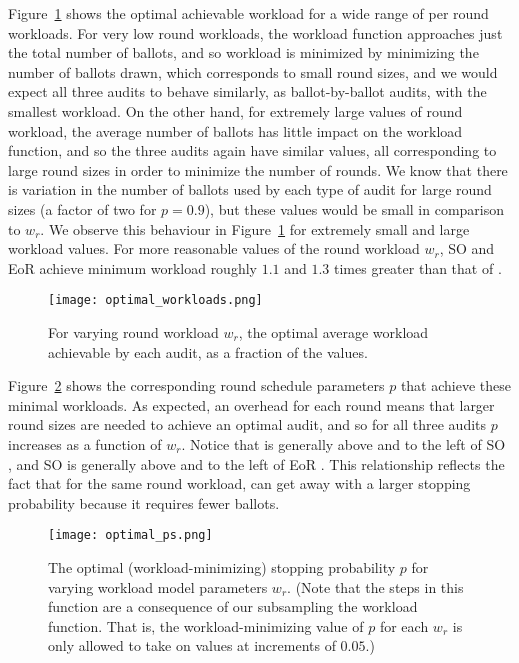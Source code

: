 Figure~\ref{fig:optimal_workloads} shows the optimal achievable workload for a wide range of per round workloads. For very low round workloads, the workload function approaches just the total number of ballots, and so workload is minimized by minimizing the number of ballots drawn, which corresponds to small round sizes, and we would expect all three audits to behave similarly, as ballot-by-ballot audits, with the smallest workload. On the other hand, for extremely large values of round workload, the average number of ballots has little impact on the workload function, and so the three audits again have similar values, all corresponding to large round sizes in order to minimize the number of rounds.  We know that there is variation in the number of ballots used by each type of audit for large round sizes (a factor of two for $p=0.9$), but these values would be small in comparison to $w_r$. We observe this behaviour in Figure~\ref{fig:optimal_workloads} for extremely small and large workload values. For more reasonable values of the round workload $w_r$, SO \BRAVO and EoR \BRAVO achieve minimum workload roughly $1.1$ and $1.3$ times greater than that of \Providence.
\begin{figure}[h!]
\texttt{[image: optimal\_workloads.png]}
\caption{For varying round workload $w_r$, the optimal average workload achievable by each audit, as a fraction of the \Providence values.}
\label{fig:optimal_workloads}
\end{figure}

Figure~\ref{fig:optimal_ps} shows the corresponding round schedule parameters $p$ that achieve these minimal workloads. As expected, an overhead for each round means that larger round sizes are needed to achieve an optimal audit, and so for all three audits $p$ increases as a function of $w_r$. Notice that \Providence is generally above and to the left of SO \BRAVO, and SO \BRAVO is generally above and to the left of EoR \BRAVO. This relationship reflects the fact that for the same round workload, \Providence can get away with a larger stopping probability because it requires fewer ballots.
\begin{figure}[h!]
\texttt{[image: optimal\_ps.png]}
\caption{The optimal (workload-minimizing) stopping probability $p$ for varying workload model parameters $w_r$. (Note that the steps in this function are a consequence of our subsampling the workload function. That is, the workload-minimizing value of $p$ for each $w_r$ is only allowed to take on values at increments of $0.05$.)}
\label{fig:optimal_ps}
\end{figure}

